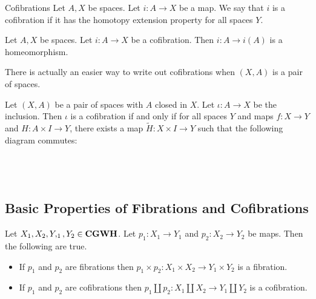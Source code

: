 \documentclass[a4paper]{article}
\begin{document}
\begin{defn}{Cofibrations}{} Let $A,X$ be spaces. Let $i:A\to X$ be a map. We say that $i$ is a cofibration if it has the homotopy extension property for all spaces $Y$. 
\end{defn}

\begin{prp}{}{} Let $A,X$ be spaces. Let $i:A\to X$ be a cofibration. Then $i:A\to i(A)$ is a homeomorphism. 
\end{prp}

There is actually an easier way to write out cofibrations when $(X,A)$ is a pair of spaces. 

\begin{lmm}{}{} Let $(X,A)$ be a pair of spaces with $A$ closed in $X$. Let $\iota:A\to X$ be the inclusion. Then $\iota$ is a cofibration if and only if for all spaces $Y$ and maps $f:X\to Y$ and $H:A\times I\to Y$, there exists a map $\tilde{H}:X\times I\to Y$ such that the following diagram commutes: \\~\\
\\~\\
\end{lmm}

\subsection{Basic Properties of Fibrations and Cofibrations}
\begin{prp}{}{} Let $X_1,X_2,Y,_1,Y_2\in\bold{CGWH}$. Let $p_1:X_1\to Y_1$ and $p_2:X_2\to Y_2$ be maps. Then the following are true. 
\begin{itemize}
\item If $p_1$ and $p_2$ are fibrations then $p_1\times p_2:X_1\times X_2\to Y_1\times Y_2$ is a fibration. 
\item If $p_1$ and $p_2$ are cofibrations then $p_1\coprod p_2:X_1\coprod X_2\to Y_1\coprod Y_2$ is a cofibration. 
\end{itemize}
\end{prp}
\end{document}
